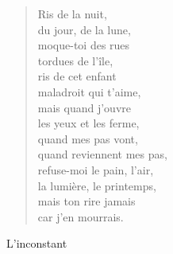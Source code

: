 \documentclass[11pt,a4paper]{book}
\begin{document}
\begin{verse}
\newpage

Ris de la nuit, \\
du jour, de la lune, \\
moque-toi des rues \\
tordues de l'île, \\
ris de cet enfant \\
maladroit qui t'aime, \\
mais quand j'ouvre \\
les yeux et les ferme, \\
quand mes pas vont, \\
quand reviennent mes pas, \\
refuse-moi le pain, l'air, \\
la lumière, le printemps, \\
mais ton rire jamais \\
car j'en mourrais.
\end{verse}

\newpage

{\huge L'inconstant} \\ \\
\end{document}
